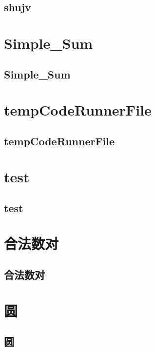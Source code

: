 \subsection{shujv}
\raggedbottom
\hrulefill

\section{Simple_Sum}
\subsection{Simple_Sum}
\raggedbottom
\hrulefill

\section{tempCodeRunnerFile}
\subsection{tempCodeRunnerFile}
\raggedbottom
\hrulefill

\section{test}
\subsection{test}
\raggedbottom
\hrulefill

\section{合法数对}
\subsection{合法数对}
\raggedbottom
\hrulefill

\section{圆}
\subsection{圆}
\raggedbottom
\hrulefill

